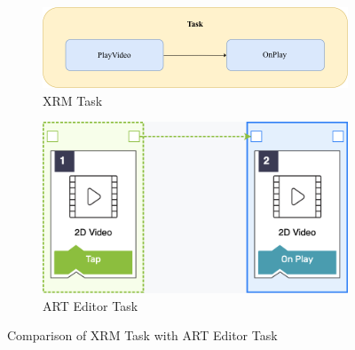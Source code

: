 \begin{figure}[H]
    \begin{subfigure}{\textwidth}
        \centering
        \includegraphics[width=0.7\columnwidth]{Figures/Editor/xrm-task.png}
        \caption{XRM Task}
        \label{fig:xrm-task}
    \end{subfigure}
    \begin{subfigure}{\textwidth}
        \centering
        \includegraphics[width=0.7\columnwidth]{Figures/Editor/art-task.png}
        \caption{ART Editor Task}
        \label{fig:art-task}
    \end{subfigure}
    \caption{Comparison of XRM Task with ART Editor Task}
    \label{fig:comparison-task-xrm-art}
\end{figure}